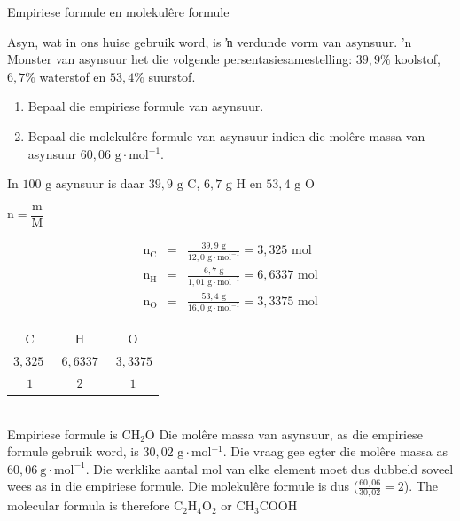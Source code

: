     \noindent
\label{m38712*secfhsst!!!underscore!!!id1308} 
      \noindent 
      \begin{wex}{Empiriese formule en molekul\^{e}re formule
      }
 {
Asyn, wat in ons huise gebruik word, is ŉ verdunde vorm van asynsuur.  'n Monster van
      asynsuur het die volgende persentasiesamestelling: $39,9\%$ koolstof, $6,7\%$ waterstof en $53,4\%$ suurstof.  
\begin{enumerate}[noitemsep, label=\textbf{\arabic*}. ] 
\item Bepaal die empiriese formule van asynsuur.
\item Bepaal die molekulêre formule van asynsuur indien die mol\^{e}re massa van asynsuur $60,06 \text{ g} \cdot \text{mol}{}^{-1}$.
\end{enumerate}
     }
{
      \label{m38712*id281607}In $100 \text{ g}$ asynsuur is daar $39,9 \text{ g C}$, $6,7 \text{ g H}$ en $53,4\text{ g O}$ 

        $\text{n}=\dfrac{\text{m}}{\text{M}}$
      
      \label{m38712*id281653}\nopagebreak\noindent{}
        
    \begin{eqnarray*}
{\text{n}}_{\text{C}} & = & \frac{39,9 \text{ g}}{12,0 \text{ g} \cdot \text{mol}^{-1}} = 3,325 \text{ mol} \\
{\text{n}}_{\text{H}} & = & \frac{6,7 \text{ g}}{1,01 \text{ g} \cdot \text{mol}^{-1}} = 6,6337 \text{ mol} \\
{\text{n}}_{\text{O}} & = & \frac{53,4 \text{ g}}{16,0 \text{ g} \cdot \text{mol}^{-1}} = 3,3375 \text{ mol}
      \end{eqnarray*}
\begin{tabular}{c@{:}c@{:}c}
$\text{C}$ & $\text{H}$ & $\text{O}$\\
$3,325~$ & $~6,6337~$ & $~3,3375$ \\
$1$ & $2$ & $1$\\
\end{tabular}\\
Empiriese formule is $\text{CH}{}_{2}\text{O}$ 
      \label{m38712*id281834}Die mol\^{e}re massa van asynsuur, as die empiriese formule gebruik word, is $30,02 \text{ g} \cdot \text{mol}{}^{-1}$. Die vraag gee egter die mol\^{e}re massa as $60,06~\text{g}\cdot \text{mol}^{-1}$. Die werklike aantal mol van elke element moet dus dubbeld soveel wees as in die empiriese formule. Die molekul\^{e}re formule is dus  ($\frac{60,06}{30,02}=2$).
      \label{m38712*id281854}The molecular formula is therefore $\text{C}{}_{2}\text{H}{}_{4}\text{O}{}_{2}$ or $\text{CH}{}_{3}\text{COOH}$
}
    \end{wex}

